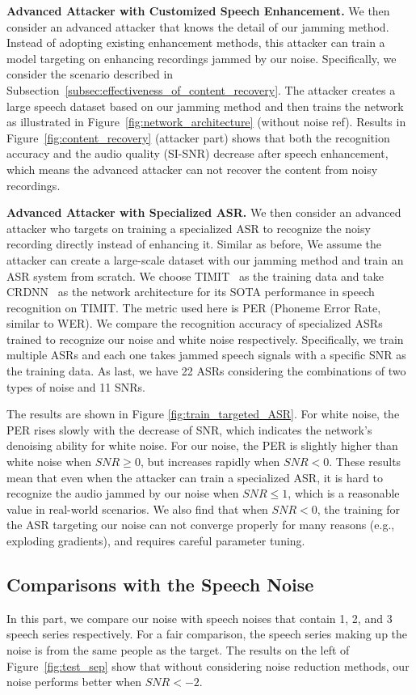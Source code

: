\textbf{Advanced Attacker with Customized Speech Enhancement.} We then consider an advanced attacker that knows the detail of our jamming method. Instead of adopting existing enhancement methods, this attacker can train a model targeting on enhancing recordings jammed by our noise. Specifically, we consider the scenario described in Subsection~\ref{subsec:effectiveness_of_content_recovery}. The attacker creates a large speech dataset based on our jamming method and then trains the network as illustrated in Figure~\ref{fig:network_architecture} (without noise ref). Results in Figure~\ref{fig:content_recovery} (attacker part) shows that both the recognition accuracy and the audio quality (SI-SNR) decrease after speech enhancement, which means the advanced attacker can not recover the content from noisy recordings.

\textbf{Advanced Attacker with Specialized ASR.}
\label{subsec:robustness_adversarial_training}
We then consider an advanced attacker who targets on training a specialized ASR to recognize the noisy recording directly instead of enhancing it. Similar as before, We assume the attacker can create a large-scale dataset with our jamming method and train an ASR system from scratch. We choose TIMIT~\cite{timit} as the training data and take CRDNN~\cite{speechbrain} as the network architecture for its SOTA performance in speech recognition on TIMIT. The metric used here is PER (Phoneme Error Rate, similar to WER). We compare the recognition accuracy of specialized ASRs trained to recognize our noise and white noise respectively. Specifically, we train multiple ASRs and each one takes jammed speech signals with a specific SNR as the training data. As last, we have 22 ASRs considering the combinations of two types of noise and 11 SNRs.

The results are shown in Figure \ref{fig:train_targeted_ASR}. For white noise, the PER rises slowly with the decrease of SNR, which indicates the network's denoising ability for white noise. For our noise, the PER is slightly higher than white noise when $SNR\geq 0$, but increases rapidly when $SNR < 0$. These results mean that even when the attacker can train a specialized ASR, it is hard to recognize the audio jammed by our noise when $SNR \leq 1$, which is a reasonable value in real-world scenarios. We also find that when $SNR<0$, the training for the ASR targeting our noise can not converge properly for many reasons (e.g., exploding gradients), and requires careful parameter tuning.


\subsection{Comparisons with the Speech Noise}
\label{subsec:comparison_with_speech_noise}
In this part, we compare our noise with speech noises that contain 1, 2, and 3 speech series respectively. For a fair comparison, the speech series making up the noise is from the same people as the target. The results on the left of Figure~\ref{fig:test_sep} show that without considering noise reduction methods, our noise performs better when $SNR<-2$.

